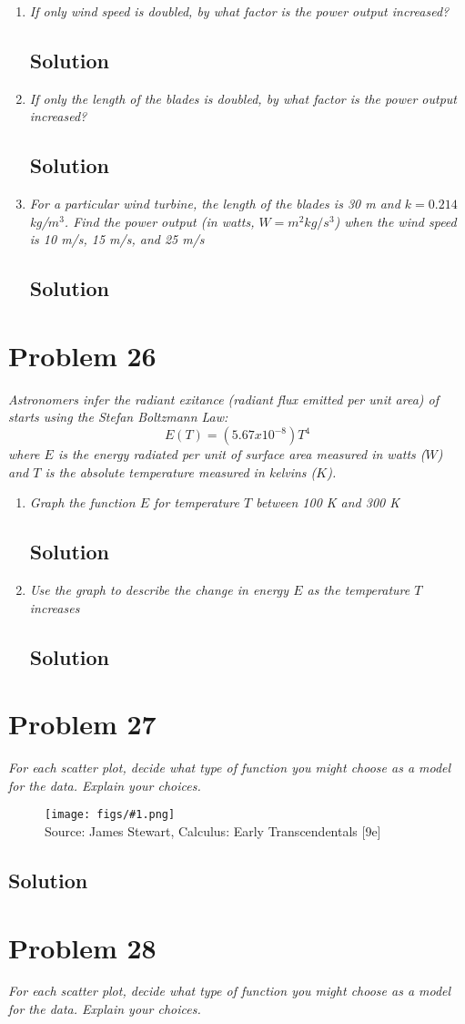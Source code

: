 \documentclass[11pt]{article}
\newcommand{\soln}{\subsection*}
\newcommand{\qn}{\textit}
\newcommand{\imagesource}[1]{{\footnotesize Source: #1}}
\newcommand{\imgqn}[1]{
	\begin{figure}[H]
		\centering
		\texttt{[image: figs/\#1.png]}\\
		\imagesource{James Stewart, Calculus: Early Transcendentals [9e]}
	\end{figure}
}
\begin{document}
\begin{enumerate}
	\item \qn{If only wind speed is doubled, by what factor is the power output increased?}
	\soln{Solution}
	
	\item \qn{If only the length of the blades is doubled, by what factor is the power output increased?}
	\soln{Solution}
	
	\item \qn{For a particular wind turbine, the length of the blades is 30 m and $k=0.214$ kg/$m^3$. Find the power output (in watts, $W=m^2kg/s^3$) when the wind speed is 10 m/s, 15 m/s, and 25 m/s}
	\soln{Solution}
\end{enumerate}

\section*{Problem 26}

\qn{Astronomers infer the radiant exitance (radiant flux emitted per unit area) of starts using the Stefan Boltzmann Law: $$E(T)=(5.67 x 10^{-8})T^4$$ where $E$ is the energy radiated per unit of surface area measured in watts ($W$) and $T$ is the absolute temperature measured in kelvins ($K$).}

\begin{enumerate}
	\item \qn{Graph the function $E$ for temperature $T$ between 100 K and 300 K}
	\soln{Solution}
	
	\item \qn{Use the graph to describe the change in energy $E$ as the temperature $T$ increases}
	\soln{Solution}
\end{enumerate}

\section*{Problem 27}

\qn{For each scatter plot, decide what type of function you might choose as a model for the data. Explain your choices.}

\imgqn{1.2.27}

\soln{Solution}

\section*{Problem 28}

\qn{For each scatter plot, decide what type of function you might choose as a model for the data. Explain your choices.}
\end{document}
